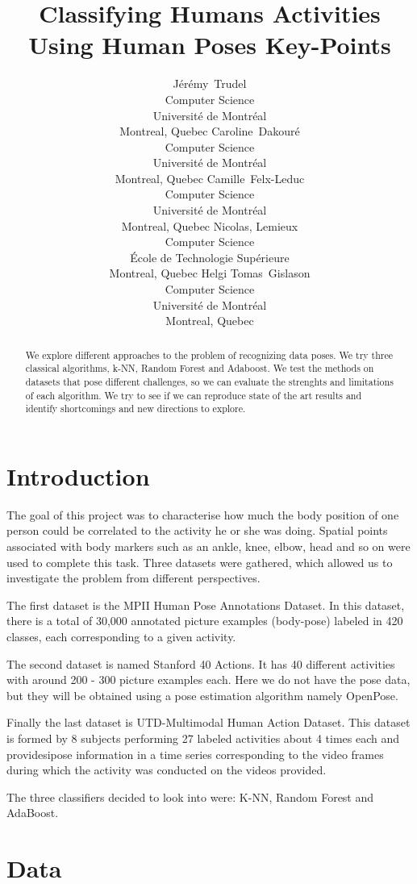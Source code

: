 \documentclass{article}
\title{Classifying Humans Activities Using Human Poses Key-Points}
\author{
Jérémy~Trudel\\
Computer Science\\
Université de Montréal\\
Montreal, Quebec\And
Caroline~Dakouré\\
Computer Science\\
Université de Montréal\\
Montreal, Quebec\And
Camille~Felx-Leduc\\
Computer Science\\
Université de Montréal\\
Montreal, Quebec\And
Nicolas, Lemieux\\
Computer Science\\
École de Technologie Supérieure\\
Montreal, Quebec\And
Helgi Tomas~Gislason\\
Computer Science\\
Université de Montréal\\
Montreal, Quebec
}
\begin{document}

\maketitle

\begin{abstract}
    We explore different approaches to the problem of recognizing data poses. We try three
    classical algorithms, k-NN, Random Forest and Adaboost. We test the methods on
    datasets that pose different challenges, so we can evaluate the strenghts and
    limitations of each algorithm.  We try to see if we can
    reproduce state of the art results and identify shortcomings and new directions to
    explore.
\end{abstract}

\section{Introduction}
The goal of this project was to characterise how much the body position of one person could be correlated to the activity he or she was doing. Spatial points associated with body markers such as an ankle, knee, elbow, head and so on were used to complete this task. Three datasets were gathered, which allowed us to investigate the problem from different perspectives.

The first dataset is the MPII Human Pose Annotations Dataset. In this dataset, there is a total of 30,000 annotated picture examples (body-pose) labeled in 420 classes, each corresponding to a given activity.

The second dataset is named Stanford 40 Actions.  It has 40 different activities with around 200 - 300 picture examples each. Here we do not have the pose data, but they will be obtained using a pose estimation algorithm namely OpenPose.

Finally the last dataset is UTD-Multimodal Human Action Dataset.  This dataset is formed by 8 subjects performing 27 labeled activities about 4 times each and providesipose information in a time series corresponding to the video frames during which the activity was conducted on the videos provided.

The three classifiers decided to look into were: K-NN, Random Forest and AdaBoost.

\section{Data}
\end{document}
